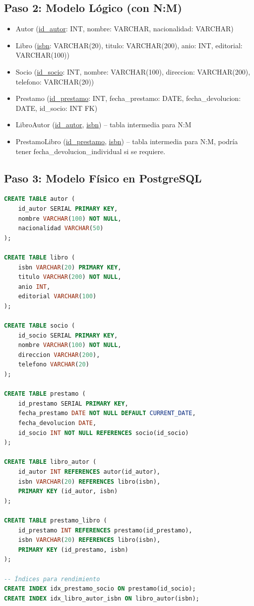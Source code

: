 \documentclass[12pt,a4paper,openany,oneside]{book}
\begin{document}
\subsection{Paso 2: Modelo Lógico (con N:M)}
\begin{itemize}
    \item Autor (\underline{id\_autor}: INT, nombre: VARCHAR, nacionalidad: VARCHAR)
    \item Libro (\underline{isbn}: VARCHAR(20), titulo: VARCHAR(200), anio: INT, editorial: VARCHAR(100))
    \item Socio (\underline{id\_socio}: INT, nombre: VARCHAR(100), direccion: VARCHAR(200), telefono: VARCHAR(20))
    \item Prestamo (\underline{id\_prestamo}: INT, fecha\_prestamo: DATE, fecha\_devolucion: DATE, id\_socio: INT FK)
    \item LibroAutor (\underline{id\_autor}, \underline{isbn}) -- tabla intermedia para N:M
    \item PrestamoLibro (\underline{id\_prestamo}, \underline{isbn}) -- tabla intermedia para N:M, podría tener fecha\_devolucion\_individual si se requiere.
\end{itemize}

\subsection{Paso 3: Modelo Físico en PostgreSQL}
\begin{lstlisting}[language=SQL]
CREATE TABLE autor (
    id_autor SERIAL PRIMARY KEY,
    nombre VARCHAR(100) NOT NULL,
    nacionalidad VARCHAR(50)
);

CREATE TABLE libro (
    isbn VARCHAR(20) PRIMARY KEY,
    titulo VARCHAR(200) NOT NULL,
    anio INT,
    editorial VARCHAR(100)
);

CREATE TABLE socio (
    id_socio SERIAL PRIMARY KEY,
    nombre VARCHAR(100) NOT NULL,
    direccion VARCHAR(200),
    telefono VARCHAR(20)
);

CREATE TABLE prestamo (
    id_prestamo SERIAL PRIMARY KEY,
    fecha_prestamo DATE NOT NULL DEFAULT CURRENT_DATE,
    fecha_devolucion DATE,
    id_socio INT NOT NULL REFERENCES socio(id_socio)
);

CREATE TABLE libro_autor (
    id_autor INT REFERENCES autor(id_autor),
    isbn VARCHAR(20) REFERENCES libro(isbn),
    PRIMARY KEY (id_autor, isbn)
);

CREATE TABLE prestamo_libro (
    id_prestamo INT REFERENCES prestamo(id_prestamo),
    isbn VARCHAR(20) REFERENCES libro(isbn),
    PRIMARY KEY (id_prestamo, isbn)
);

-- Índices para rendimiento
CREATE INDEX idx_prestamo_socio ON prestamo(id_socio);
CREATE INDEX idx_libro_autor_isbn ON libro_autor(isbn);
\end{lstlisting}
\end{document}
